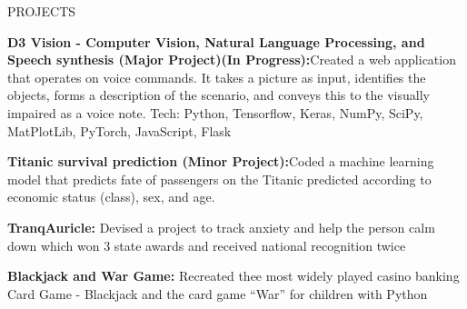 \documentclass{resume}
\begin{document}

\vspace{-1.4em}

\begin{rSection}{PROJECTS}

\vspace{-1.25em}

\item \textbf{D3 Vision - Computer Vision, Natural Language Processing, and Speech synthesis (Major Project)(In Progress):}{Created a web application that operates on voice commands. It takes a picture as input, identifies the objects, forms a description of the scenario, and conveys this to the visually impaired as a voice note. Tech: Python, Tensorflow, Keras, NumPy, SciPy, MatPlotLib, PyTorch, JavaScript, Flask}

\vspace{-0.5em}

\item \textbf{Titanic survival prediction (Minor Project):}{Coded a machine learning model that predicts fate of passengers on the Titanic predicted according to economic status (class), sex, and age.}

\vspace{-0.5em}

\item \textbf{TranqAuricle:} {Devised a project to track anxiety and help the person calm down which won 3 state awards and received national recognition twice}

\vspace{-0.5em}

\item \textbf{Blackjack and War Game:} {Recreated thee most widely played casino banking Card Game - Blackjack and the card game “War” for children with Python
}

\vspace{-1em}

\end{rSection} 
\end{document}

